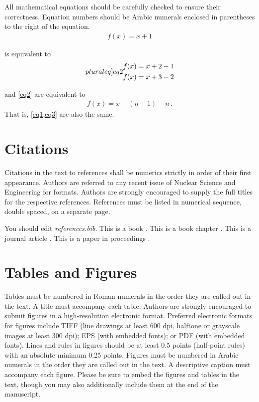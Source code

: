 \documentclass[12pt]{article}
\begin{document}
All mathematical equations should be carefully checked to ensure their correctness. Equation numbers should be Arabic numerals enclosed in parentheses to the right of the equation.
\begin{align}\label{eq1}
f(x) = x+1
\end{align}

 is equivalent to
\begin{subequations}\label[pluraleq]{eq2}
\begin{align}
f(x) = x+2-1\\
f(x) = x+3-2
\end{align}
\end{subequations}

and \cref{eq2} are equivalent to
\begin{align}\label{eq3}
f(x) = x+(n+1)-n\, .
\end{align}
That is, \cref{eq1,eq3} are also the same.

\section{Citations}

Citations in the text to references shall be numerics strictly in order of their first appearance. Authors are referred to any recent issue of Nuclear Science and Engineering for formats. Authors are strongly encouraged to supply the full titles for the respective references. References must be listed in numerical sequence, double spaced, on a separate page.

You should edit {\em references.bib}. This is a book \cite{pom91}. This is a book chapter \cite{gol12}. This is a journal article \cite{vas16}. This is a paper in proceedings \cite{mc15}.

\section{Tables and Figures}

Tables must be numbered in Roman numerals in the order they are called out in the text. A title must accompany each table. Authors are strongly encouraged to submit figures in a high-resolution electronic format. Preferred electronic formats for figures include TIFF (line drawings at least 600 dpi, halftone or grayscale images at least 300 dpi); EPS (with embedded fonts); or PDF (with embedded fonts). Lines and rules in figures should be at least 0.5 points (half-point rules) with an absolute minimum 0.25 points. Figures must be numbered in Arabic numerals in the order they are called out in the text. A descriptive caption must accompany each figure. Please be sure to embed the figures and tables in the text, though you may also additionally include them at the end of the manuscript.
\end{document}
